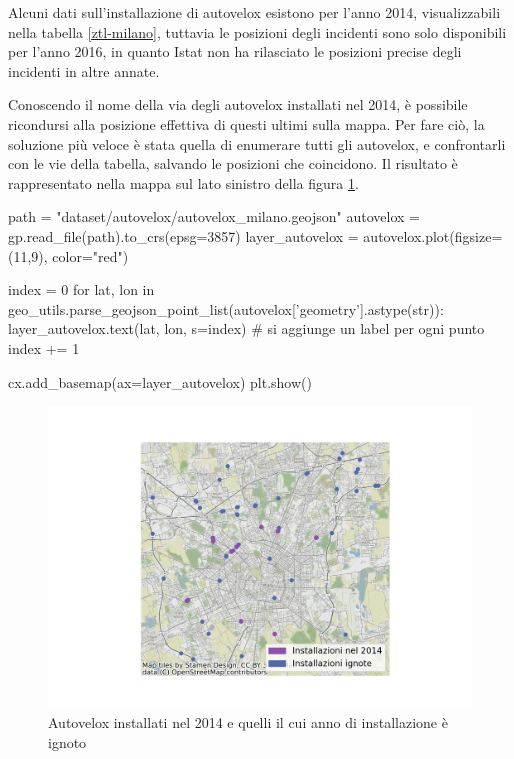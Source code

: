 \documentclass[a4paper,12pt]{report}
\begin{document}
Alcuni dati sull'installazione di autovelox esistono per l'anno 2014, visualizzabili 
nella tabella \ref{ztl-milano}, tuttavia le posizioni degli incidenti 
sono solo disponibili per l'anno 2016, in quanto Istat non ha rilasciato 
le posizioni precise degli incidenti in altre annate.

Conoscendo il nome della via degli autovelox installati nel 2014, è possibile ricondursi 
alla posizione effettiva di questi ultimi sulla mappa.
Per fare ciò, la soluzione più veloce è stata quella di enumerare tutti gli autovelox, 
e confrontarli con le vie della tabella, salvando le posizioni che coincidono.
Il risultato è rappresentato nella mappa sul lato sinistro della 
figura \ref{fig:autovelox-indici}.

\begin{code}[language=Python]
path = "dataset/autovelox/autovelox_milano.geojson"
autovelox = gp.read_file(path).to_crs(epsg=3857)
layer_autovelox = autovelox.plot(figsize=(11,9), color="red")
    
index = 0
for lat, lon in geo_utils.parse_geojson_point_list(autovelox['geometry'].astype(str)):
    layer_autovelox.text(lat, lon, s=index)
    # si aggiunge un label per ogni punto
    index += 1
    
cx.add_basemap(ax=layer_autovelox)
plt.show()
\end{code}

\begin{figure}
    \includegraphics[width=\linewidth]{../src/autovelox/autovelox_2014.png}
    \caption{Autovelox installati nel 2014 e quelli il cui anno di installazione è ignoto}
    \label{fig:autovelox-indici}
\end{figure}
\end{document}
